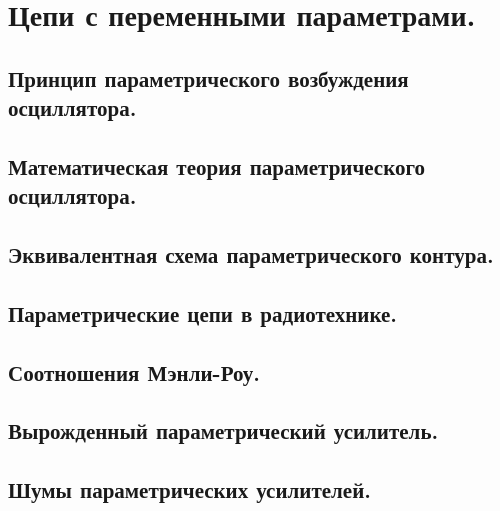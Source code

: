 \documentclass[../main/main.tex]{subfiles}
\begin{document}
\section{Цепи с переменными параметрами.}

\subsection{Принцип параметрического возбуждения осциллятора.}

\subsection{Математическая теория параметрического осциллятора.}

\subsection{Эквивалентная схема параметрического контура.}

\subsection{Параметрические цепи в радиотехнике.}

\subsection{Соотношения Мэнли-Роу.}

\subsection{Вырожденный параметрический усилитель.}

\subsection{Шумы параметрических усилителей.}
\end{document}
